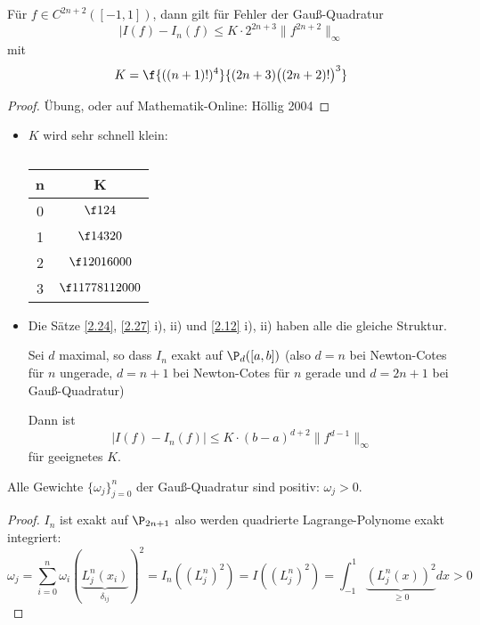 \documentclass[11pt]{scrbook}
\begin{document}
\begin{st}[Fehlerschranke]
	\label{2.24}
	Für $f\in C^{2n+2} ([-1,1])$, dann gilt für Fehler der Gauß-Quadratur
	\[
		|I(f) - I_n(f) \le K \cdot 2^{2n+3} \|f^{2n+2}\|_\infty
	\]
	mit
	\[
		K = \f {((n+1)!)^4}{(2n+3)\big((2n+2)!\big)^3}
	\]
	\begin{proof}
		Übung, oder auf Mathematik-Online: Höllig 2004
	\end{proof}
	\begin{note}
		\begin{itemize}
			\item
				$K$ wird sehr schnell klein:
				\begin{table}[!ht]
					\centering
					\caption{}
					\begin{tabular}{c|c}
					n & K \\ \hline
					0 & $\f 1{24}$ \\
					1 & $\f 1{4320}$ \\
					2 & $\f 1{2016000}$ \\
					3 & $\f 1{1778112000}$ 
					\end{tabular}
				\end{table}
			\item
				Die Sätze \ref{2.24}, \ref{2.27} i), ii) und \ref{2.12} i), ii) haben alle die gleiche Struktur.

				Sei $d$ maximal, so dass $I_n$ exakt auf $\P_d([a,b])$ (also $d=n$ bei Newton-Cotes für $n$ ungerade, $d=n+1$ bei Newton-Cotes für $n$ gerade und $d=2n+1$ bei Gauß-Quadratur)

				Dann ist
				\[
					|I(f) - I_n(f) | \le K \cdot (b-a)^{d+2} \|f^{d-1}\|_\infty
				\]
				für geeignetes $K$.
		\end{itemize}
	\end{note}
\end{st}

\begin{st}[Positivität]
	\label{2.25}	
	Alle Gewichte $\{\omega_j\}_{j=0}^n$ der Gauß-Quadratur sind positiv: $\omega_j > 0$.
	\begin{proof}
		$I_n$ ist exakt auf $\P_{2n+1}$ also werden quadrierte Lagrange-Polynome exakt integriert:
		\[
			\omega_j = \sum_{i=0}^n \omega_i (\underbrace{L_j^n(x_i)}_{\delta_{ij}})^2 = I_n((L_j^n)^2) = I((L_j^n)^2) =\int_{-1}^1 \underbrace{(L_j^n(x))^2}_{\ge 0} dx > 0
		\]
	\end{proof}
\end{st}
\end{document}
